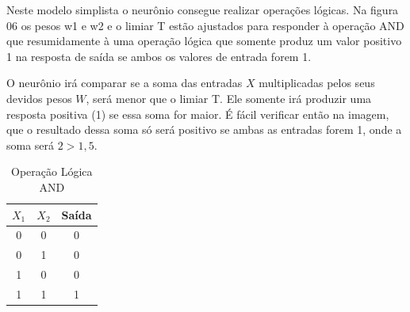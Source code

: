 \documentclass[	12pt, Times, openright, twoside, a4paper, english, brazil]{abntex2}
\begin{document}
            Neste modelo simplista o neurônio consegue realizar operações lógicas. Na figura 06 os pesos w1 e w2 e o limiar T estão ajustados para responder à operação AND que resumidamente à uma operação lógica que somente produz um valor positivo 1 na resposta de saída se ambos os valores de entrada forem 1.
            \begin{figure}[H]
            \end{figure}
           O neurônio irá comparar se a soma das entradas $X$ multiplicadas pelos seus devidos pesos $W$, será menor que o limiar T. Ele somente irá produzir uma resposta positiva (1) se essa soma for maior. É fácil verificar então na imagem, que o resultado dessa soma só será positivo  se ambas as entradas forem 1, onde a soma será $2>1,5$.

            \begin{table}[!ht]
            \centering
            \caption{Operação Lógica AND} \label{tab:and}
              \begin{tabular}{|c|c|c|}
                  \hline  \textbf{$X_1$} & \textbf{$X_2$} &  \textbf{Saída}\\
                  \hline 0 & 0 & 0\\
                  \hline 0 & 1 & 0\\
                  \hline 1 & 0 & 0\\
                  \hline 1 & 1 & 1\\
                  \hline 
              \end{tabular}
            \end{table}
\end{document}
